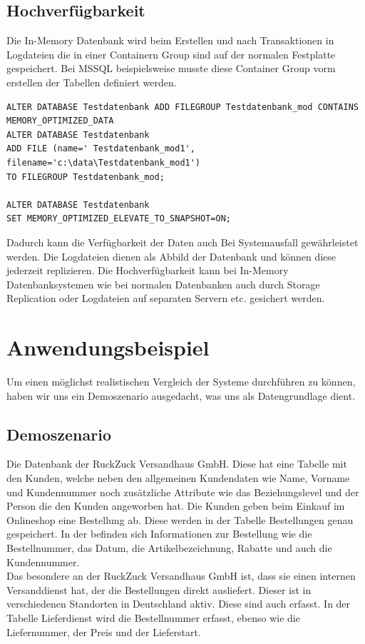 \documentclass[a4paper, 12pt]{scrartcl}
\begin{document}
\subsection{Hochverfügbarkeit}
Die In-Memory Datenbank wird beim Erstellen und nach Transaktionen in Logdateien die in einer Containern Group sind auf der normalen Festplatte gespeichert.
Bei MSSQL beispielsweise musste diese Container Group vorm erstellen der Tabellen definiert werden.
\begin{verbatim}
ALTER DATABASE Testdatenbank ADD FILEGROUP Testdatenbank_mod CONTAINS 
MEMORY_OPTIMIZED_DATA   
ALTER DATABASE Testdatenbank 
ADD FILE (name=' Testdatenbank_mod1', filename='c:\data\Testdatenbank_mod1') 
TO FILEGROUP Testdatenbank_mod;

ALTER DATABASE Testdatenbank 
SET MEMORY_OPTIMIZED_ELEVATE_TO_SNAPSHOT=ON;  
\end{verbatim}
Dadurch kann die Verfügbarkeit der Daten auch Bei Systemausfall gewährleistet werden.
Die Logdateien dienen als Abbild der Datenbank und können diese jederzeit replizieren.
Die Hochverfügbarkeit kann bei In-Memory Datenbanksystemen wie bei normalen Datenbanken auch durch Storage Replication oder Logdateien auf separaten Servern etc. gesichert werden.



\newpage
\section{Anwendungsbeispiel}
Um einen möglichst realistischen Vergleich der Systeme durchführen zu können, haben wir uns ein Demoszenario ausgedacht, was uns als Datengrundlage dient. 
\subsection{Demoszenario}
Die Datenbank der RuckZuck Versandhaus GmbH. Diese hat eine Tabelle mit den Kunden, welche neben den allgemeinen Kundendaten wie Name, Vorname und Kundennummer noch zusätzliche Attribute wie das Beziehungslevel und der Person die den Kunden angeworben hat. Die Kunden geben beim Einkauf im Onlineshop eine Bestellung ab. Diese werden in der Tabelle Bestellungen genau gespeichert. In der befinden sich Informationen zur Bestellung wie die Bestellnummer, das Datum, die Artikelbezeichnung, Rabatte und auch die Kundennummer. \\ Das besondere an der RuckZuck Versandhaus GmbH ist, dass sie einen internen Versanddienst hat, der die Bestellungen direkt ausliefert. Dieser ist in verschiedenen Standorten in Deutschland aktiv. Diese sind auch erfasst. In der Tabelle Lieferdienst wird die Bestellnummer erfasst, ebenso wie die Liefernummer, der Preis und der Lieferstart.
\end{document}
